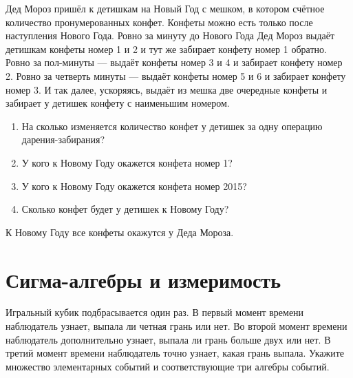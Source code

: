 \begin{problem}
Дед Мороз пришёл к детишкам на Новый Год с мешком, в котором счётное количество пронумерованных конфет. Конфеты можно есть только после наступления Нового Года. Ровно за минуту до Нового Года Дед Мороз выдаёт детишкам конфеты номер 1 и 2 и тут же забирает конфету номер 1 обратно. Ровно за пол-минуты — выдаёт конфеты номер 3 и 4 и забирает конфету номер 2. Ровно за четверть минуты — выдаёт конфеты номер 5 и 6 и забирает конфету номер 3. И так далее, ускоряясь, выдаёт из мешка две очередные конфеты и забирает у детишек конфету с наименьшим номером.

\begin{enumerate}
\item На сколько изменяется количество конфет у детишек за одну операцию дарения-забирания?
\item У кого к Новому Году окажется конфета номер 1?
\item У кого к Новому Году окажется конфета номер 2015?
\item Сколько конфет будет у детишек к Новому Году?
\end{enumerate}


\begin{sol}
К Новому Году все конфеты окажутся у Деда Мороза.
\end{sol}
\end{problem}



\section{Сигма-алгебры и измеримость}

\begin{problem}
Игральный кубик подбрасывается один раз. В первый момент времени
наблюдатель узнает, выпала ли четная грань или нет. Во второй
момент времени наблюдатель дополнительно узнает, выпала ли грань больше двух
или нет. В третий момент времени наблюдатель точно узнает, какая
грань выпала. Укажите множество элементарных событий и
соответствующие три алгебры событий.


\begin{sol}


\end{sol}
\end{problem}

